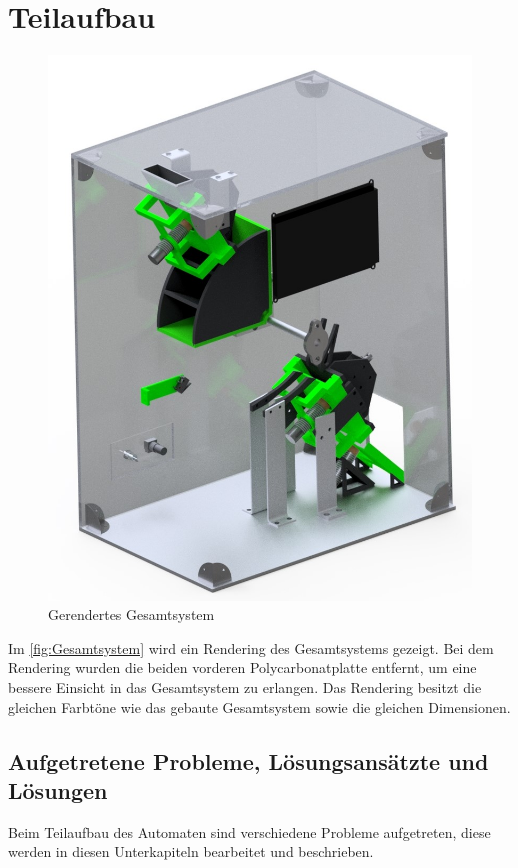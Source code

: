 \section{Teilaufbau}
\begin{figure}[H]
    \centering
    \includegraphics[scale=0.7,page=1]{fig/mech/ReShuffledCombined}
    \caption{Gerendertes Gesamtsystem}
    \label{fig:Gesamtsystem}
\end{figure}

Im \autoref{fig:Gesamtsystem} wird ein Rendering des Gesamtsystems gezeigt.
Bei dem Rendering wurden die beiden vorderen Polycarbonatplatte entfernt, um eine bessere Einsicht in das Gesamtsystem zu erlangen.
Das Rendering besitzt die gleichen Farbtöne wie das gebaute Gesamtsystem sowie die gleichen Dimensionen.

\subsection{Aufgetretene Probleme, Lösungsansätzte und Lösungen}
Beim Teilaufbau des Automaten sind verschiedene Probleme aufgetreten, diese werden in diesen Unterkapiteln bearbeitet und beschrieben.

